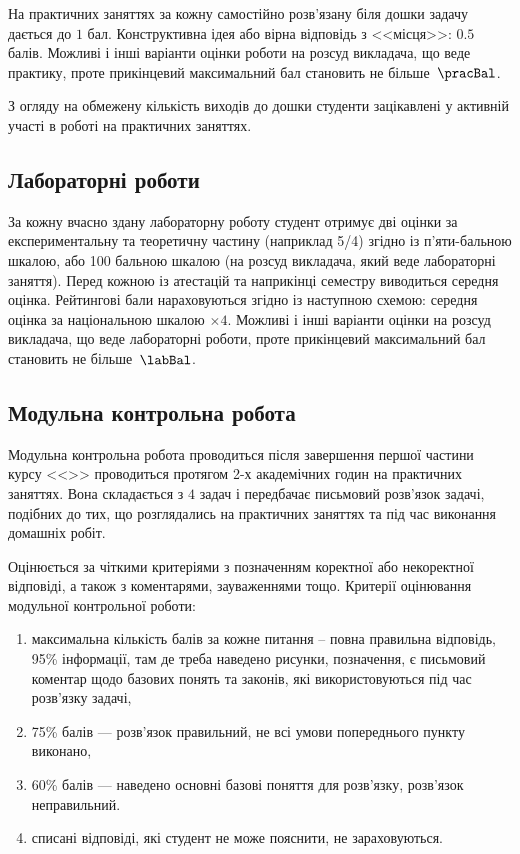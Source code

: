 \documentclass{Syllabus}
\begin{document}
На практичних заняттях за кожну самостійно розв’язану біля дошки задачу дається до $1$ бал. Конструктивна ідея або вірна відповідь з <<місця>>: $0.5$ балів. Можливі і інші варіанти оцінки роботи на розсуд викладача, що веде практику, проте прикінцевий максимальний бал становить не більше~$\pracBal$.

З огляду на обмежену кількість виходів до дошки студенти зацікавлені у активній участі в роботі на практичних заняттях.

\subsection*{Лабораторні роботи}

За кожну вчасно здану лабораторну роботу студент отримує дві оцінки за експериментальну та теоретичну частину (наприклад 5/4) згідно із п'яти-бальною шкалою, або 100 бальною шкалою (на розсуд викладача, який веде лабораторні заняття). Перед кожною із атестацій та наприкінці семестру виводиться середня оцінка. Рейтингові бали нараховуються згідно із наступною схемою: середня оцінка за національною шкалою $\times 4$. Можливі і інші варіанти оцінки на розсуд викладача, що веде лабораторні роботи, проте прикінцевий максимальний бал становить не більше~$\labBal$.



\subsection*{Модульна контрольна робота}


Модульна контрольна робота проводиться після завершення першої частини курсу <<\discipline>> проводиться протягом 2-х академічних годин на практичних заняттях. Вона складається з $4$ задач і передбачає письмовий розв’язок задачі, подібних до тих, що розглядались на практичних заняттях та під час виконання домашніх робіт.

Оцінюється за чіткими критеріями з позначенням коректної або некоректної відповіді, а також з коментарями, зауваженнями тощо. Критерії оцінювання модульної контрольної роботи:
\begin{enumerate}[label=$\bullet$]
\item максимальна кількість балів за кожне питання – повна правильна відповідь, 95\% інформації, там де треба наведено рисунки, позначення, є письмовий коментар щодо базових понять та законів, які використовуються під час розв’язку задачі,
\item 75\% балів --- розв’язок правильний, не всі умови попереднього пункту виконано,
\item 60\% балів --- наведено основні базові поняття для розв’язку, розв’язок неправильний.
\item списані відповіді, які студент не може пояснити, не зараховуються.
\end{enumerate}
\end{document}
